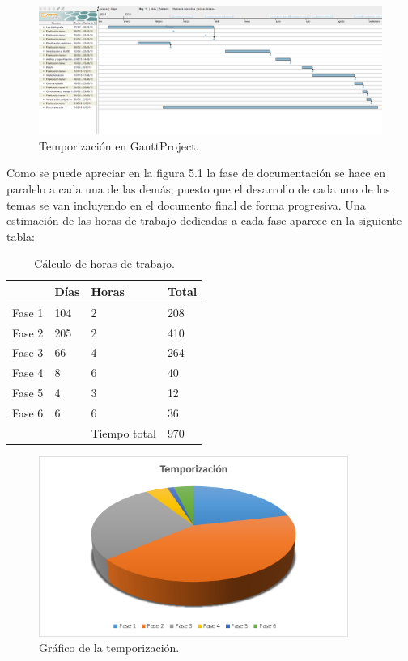 \begin{landscape}
\begin{figure}
\centering
\includegraphics[width=1.8\textwidth]{imagenes/figuras/5_1.png}
\caption{Temporización en GanttProject.}
\end{figure}
\end{landscape}

\bigskip

Como se puede apreciar en la figura 5.1 la fase de documentación se hace en paralelo a cada una de las demás, puesto que el desarrollo de cada uno de los temas se van incluyendo en el documento final de forma progresiva.
Una estimación de las horas de trabajo dedicadas a cada fase aparece en la siguiente  tabla:

\bigskip
\begin{table}[htb]
\begin{center}
\begin{tabular}{|l|l|l|l|}
\hline
  & Días & Horas & Total \\
\hline \hline
Fase 1 & 104 & 2 & 208 \\ \hline
Fase 2 & 205 & 2 & 410 \\ \hline
Fase 3 & 66 &4 & 264 \\ \hline
Fase 4 & 8 & 6 & 40 \\ \hline
Fase 5 & 4 & 3 & 12 \\ \hline
Fase 6 & 6 & 6 & 36 \\ \hline
&&Tiempo total & 970 \\ \hline
\end{tabular}
\caption{Cálculo de horas de trabajo.}
\end{center}
\end{table}

\begin{figure}[H]
\centering
\includegraphics[width=0.9\textwidth]{imagenes/figuras/5_2.png}
\caption{Gráfico de la temporización.}
\end{figure}


